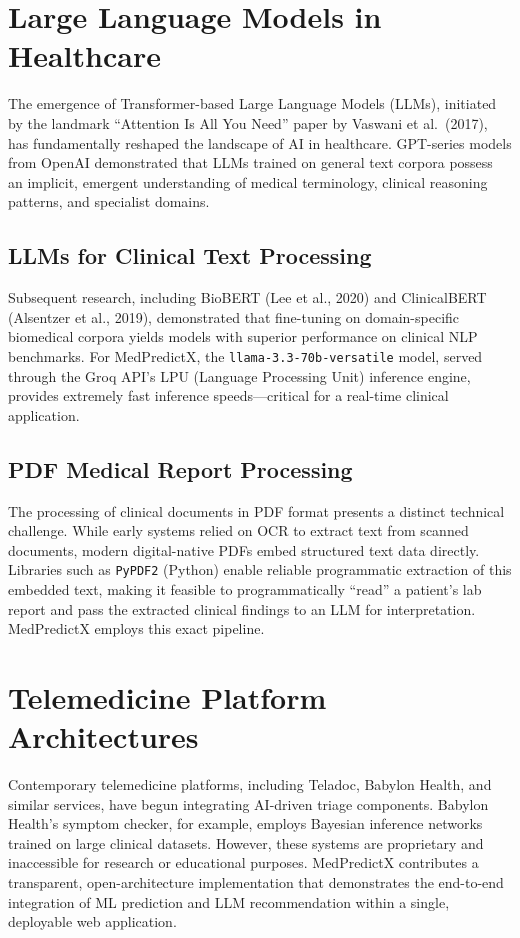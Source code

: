 \section{Large Language Models in Healthcare}

The emergence of Transformer-based Large Language Models (LLMs), initiated by the landmark ``Attention Is All You Need'' paper by Vaswani et al.\ (2017), has fundamentally reshaped the landscape of AI in healthcare. GPT-series models from OpenAI demonstrated that LLMs trained on general text corpora possess an implicit, emergent understanding of medical terminology, clinical reasoning patterns, and specialist domains.

\subsection{LLMs for Clinical Text Processing}
Subsequent research, including BioBERT (Lee et al., 2020) and ClinicalBERT (Alsentzer et al., 2019), demonstrated that fine-tuning on domain-specific biomedical corpora yields models with superior performance on clinical NLP benchmarks. For MedPredictX, the \texttt{llama-3.3-70b-versatile} model, served through the Groq API's LPU (Language Processing Unit) inference engine, provides extremely fast inference speeds---critical for a real-time clinical application.

\subsection{PDF Medical Report Processing}
The processing of clinical documents in PDF format presents a distinct technical challenge. While early systems relied on OCR to extract text from scanned documents, modern digital-native PDFs embed structured text data directly. Libraries such as \texttt{PyPDF2} (Python) enable reliable programmatic extraction of this embedded text, making it feasible to programmatically ``read'' a patient's lab report and pass the extracted clinical findings to an LLM for interpretation. MedPredictX employs this exact pipeline.

\section{Telemedicine Platform Architectures}

Contemporary telemedicine platforms, including Teladoc, Babylon Health, and similar services, have begun integrating AI-driven triage components. Babylon Health's symptom checker, for example, employs Bayesian inference networks trained on large clinical datasets. However, these systems are proprietary and inaccessible for research or educational purposes. MedPredictX contributes a transparent, open-architecture implementation that demonstrates the end-to-end integration of ML prediction and LLM recommendation within a single, deployable web application.

